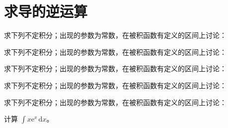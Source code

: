\renewcommand{\thesection}{\arabic{section}}\renewcommand{\theHsection}{chapter.\arabic{section}}\setcounter{section}{4}\section{求导的逆运算}
\noindent\begin{minipage}{\textwidth}
求下列不定积分；出现的参数为常数，在被积函数有定义的区间上讨论：
\end{minipage}\par\vfill
\noindent\begin{minipage}{\textwidth}
求下列不定积分；出现的参数为常数，在被积函数有定义的区间上讨论：
\end{minipage}\par\vfill
\noindent\begin{minipage}{\textwidth}
求下列不定积分；出现的参数为常数，在被积函数有定义的区间上讨论：
\end{minipage}\par\vfill
\newpage
\noindent\begin{minipage}{\textwidth}
求下列不定积分；出现的参数为常数，在被积函数有定义的区间上讨论：
\end{minipage}\par\vfill
\noindent\begin{minipage}{\textwidth}
求下列不定积分；出现的参数为常数，在被积函数有定义的区间上讨论：
\end{minipage}\par\vfill
\noindent\begin{minipage}{\textwidth}
计算 $\int x\mathrm e^x\,\mathrm dx$。
\end{minipage}\par\vfill
